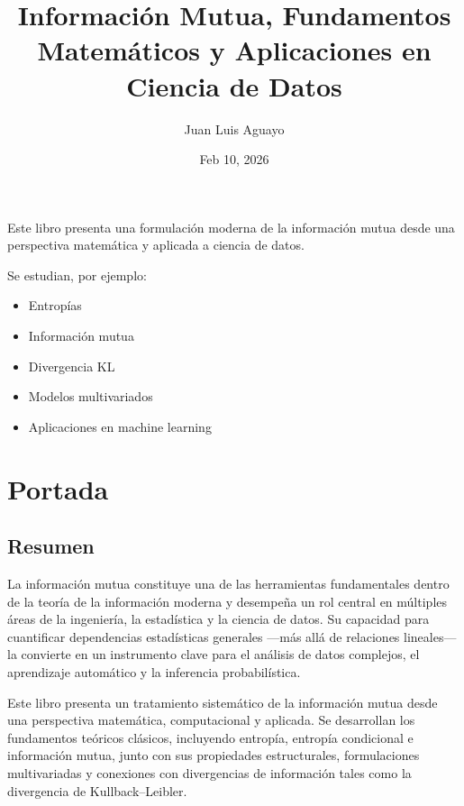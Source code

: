 \documentclass[letterpaper,10pt,english]{jupyterBook}
\title{Información Mutua, Fundamentos Matemáticos y Aplicaciones en Ciencia de Datos}
\date{Feb 10, 2026}
\author{Juan Luis Aguayo}
\begin{document}
\pagestyle{empty}
\sphinxmaketitle
\pagestyle{plain}
\sphinxtableofcontents
\pagestyle{normal}
\label{\detokenize{intro::doc}}


\sphinxAtStartPar
Este libro presenta una formulación moderna de la información mutua desde una perspectiva matemática y aplicada a ciencia de datos.

\sphinxAtStartPar
Se estudian, por ejemplo:
\begin{itemize}
\item {} 
\sphinxAtStartPar
Entropías

\item {} 
\sphinxAtStartPar
Información mutua

\item {} 
\sphinxAtStartPar
Divergencia KL

\item {} 
\sphinxAtStartPar
Modelos multivariados

\item {} 
\sphinxAtStartPar
Aplicaciones en machine learning

\end{itemize}

\sphinxstepscope


\part{Portada}

\sphinxstepscope


\chapter{Resumen}
\label{\detokenize{00_frontmatter/abstract:resumen}}\label{\detokenize{00_frontmatter/abstract::doc}}
\sphinxAtStartPar
La información mutua constituye una de las herramientas fundamentales dentro de la teoría de la información moderna y desempeña un rol central en múltiples áreas de la ingeniería, la estadística y la ciencia de datos. Su capacidad para cuantificar dependencias estadísticas generales —más allá de relaciones lineales— la convierte en un instrumento clave para el análisis de datos complejos, el aprendizaje automático y la inferencia probabilística.

\sphinxAtStartPar
Este libro presenta un tratamiento sistemático de la información mutua desde una perspectiva matemática, computacional y aplicada. Se desarrollan los fundamentos teóricos clásicos, incluyendo entropía, entropía condicional e información mutua, junto con sus propiedades estructurales, formulaciones multivariadas y conexiones con divergencias de información tales como la divergencia de Kullback–Leibler.
\end{document}
